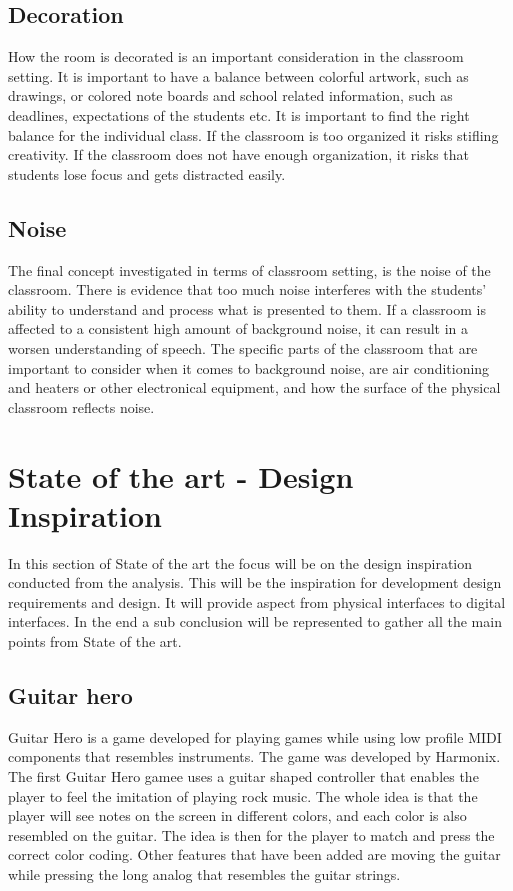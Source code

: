 \subsection{Decoration}
How the room is decorated is an important consideration in the classroom setting. It is important to have a balance between colorful artwork, such as drawings, or colored note boards and school related information, such as deadlines, expectations of the students etc.\cite{classroomsetting} It is important to find the right balance for the individual class. If the classroom is too organized it risks stifling creativity. If the classroom does not have enough organization, it risks that students lose focus and gets distracted easily.\cite{classroomsetting}\\

\subsection{Noise}
The final concept investigated in terms of classroom setting, is the noise of the classroom. There is evidence that too much noise interferes with the students’ ability to understand and process what is presented to them.\cite{classroomnoise} If a classroom is affected to a consistent high amount of background noise, it can result in a worsen understanding of speech.\cite{classroomnoise} The specific parts of the classroom that are important to consider when it comes to background noise, are air conditioning and heaters or other electronical equipment, and how the surface of the physical classroom reflects noise.\cite{classroomnoise}\\



\section{State of the art - Design Inspiration}\label{sec:sota}
In this section of State of the art the focus will be on the design inspiration conducted from the analysis. This will be the inspiration for development design requirements and design. It will provide aspect from physical interfaces to digital interfaces. In the end a sub conclusion will be represented to gather all the main points from State of the art. 

\subsection{Guitar hero}\label{sec:guitarHero} 
Guitar Hero is a game developed for playing games while using low profile MIDI components that resembles instruments. The game was developed by Harmonix. The first Guitar Hero gamee uses a guitar shaped controller that enables the player to feel the imitation of playing rock music. The whole idea is that the player will see notes on the screen in different colors, and each color is also resembled on the guitar. The idea is then for the player to match and press the correct color coding. Other features that have been added are moving the guitar while pressing the long analog that resembles the guitar strings. 

